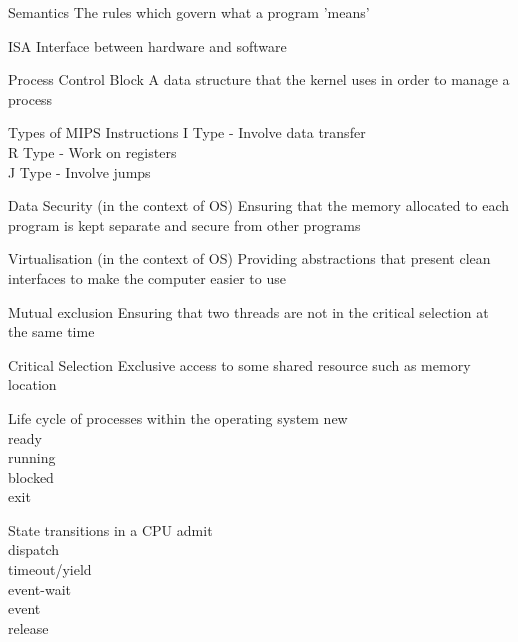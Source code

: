 \documentclass[grid,avery5371]{flashcards}
\begin{document}
\begin{flashcard}[]{Semantics}
	The rules which govern what a program 'means'
\end{flashcard}


\begin{flashcard}[]{ISA}
	Interface between hardware and software
\end{flashcard}


\begin{flashcard}[]{Process Control Block}
	A data structure that the kernel uses in order to manage a process
\end{flashcard}

\begin{flashcard}[]{Types of MIPS Instructions}
	I Type - Involve data transfer\\
	R Type - Work on registers\\
	J Type - Involve jumps
\end{flashcard}

\begin{flashcard}[]{Data Security (in the context of OS)}
	Ensuring that the memory allocated to each program is kept separate and secure from other programs
\end{flashcard}

\begin{flashcard}[]{Virtualisation (in the context of OS)}
	Providing abstractions that present clean interfaces to make the computer easier to use
\end{flashcard}


\begin{flashcard}[]{Mutual exclusion}
	Ensuring that two threads are not in the critical selection at the same time
\end{flashcard}

\begin{flashcard}[]{Critical Selection}
	Exclusive access to some shared resource such as memory location
\end{flashcard}

\begin{flashcard}[]{Life cycle of processes within the operating system}
	new\\
	ready\\
	running\\
	blocked\\
	exit
\end{flashcard}

\begin{flashcard}[]{State transitions in a CPU}
	{\small
	admit\\
	dispatch\\
	timeout/yield\\
	event-wait\\
	event\\
	release\\}
\end{flashcard}
\end{document}
